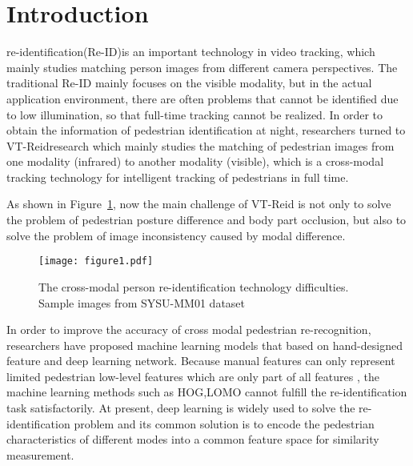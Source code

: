 \documentclass[journal]{IEEEtran}
\begin{document}
\maketitle
\IEEEdisplaynontitleabstractindextext
\IEEEpeerreviewmaketitle

	
\section{Introduction}
\label{sec:introduction}
	 re-identification(Re-ID)\textsuperscript{\cite{ye2021deep}}is an important technology in video tracking, which mainly studies matching person images from different camera perspectives. The traditional Re-ID mainly focuses on the visible modality, but in the actual application environment, there are often problems that cannot be identified due to low illumination, so that full-time tracking cannot be realized. In order to obtain the information of pedestrian identification at night, researchers turned to VT-Reid\textsuperscript{\cite{wu2017rgb}}research which mainly studies the matching of pedestrian images from one modality (infrared) to another modality (visible), which is a cross-modal tracking technology for intelligent tracking of pedestrians in full time. 
	
	As shown in Figure~\ref{fig challenge}, now the main challenge of VT-Reid is not only to solve the problem of pedestrian posture difference and body part occlusion, but also to solve the problem of image inconsistency caused by modal difference.	
\begin{figure}[!t]
		\centering
		\texttt{[image: figure1.pdf]}
		\vspace{-.05in}
		\caption{The cross-modal person re-identification technology difficulties. Sample images from SYSU-MM01 dataset\textsuperscript{\cite{wu2017rgb}}}
		\label{fig challenge}
	\end{figure}
	
	In order to improve the accuracy of cross modal pedestrian re-recognition, researchers have proposed machine learning models that based on hand-designed feature and deep learning network. Because manual features can only represent limited pedestrian low-level features which are only part of all features , the machine learning methods such as HOG\textsuperscript{\cite{dalal2005histograms}},LOMO\textsuperscript{\cite{liao2015person}} cannot fulfill the re-identification task satisfactorily. At present, deep learning is widely used to solve the re-identification problem and its common solution is to encode the pedestrian characteristics of different modes into a common feature space for similarity measurement.
	
\end{document}
